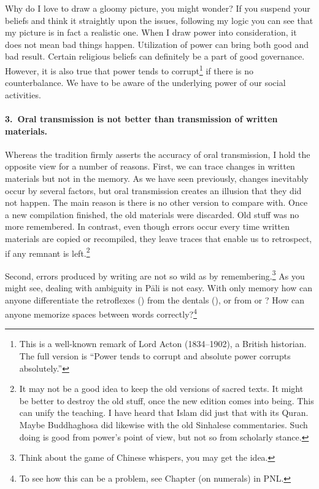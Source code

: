 Why do I love to draw a gloomy picture, you might wonder? If you suspend your beliefs and think it straightly upon the issues, following my logic you can see that my picture is in fact a realistic one. When I draw power into consideration, it does not mean bad things happen. Utilization of power can bring both good and bad result. Certain religious beliefs can definitely be a part of good governance. However, it is also true that power tends to corrupt\footnote{This is a well-known remark of Lord Acton (1834--1902), a British historian. The full version is ``Power tends to corrupt and absolute power corrupts absolutely.''} if there is no counterbalance. We have to be aware of the underlying power of our social activities.

\paragraph*{3.\ Oral transmission is not better than transmission of written materials.} Whereas the tradition firmly asserts the accuracy of oral transmission, I hold the opposite view for a number of reasons. First, we can trace changes in written materials but not in the memory. As we have seen previously, changes inevitably occur by several factors, but oral transmission creates an illusion that they did not happen. The main reason is there is no other version to compare with. Once a new compilation finished, the old materials were discarded. Old stuff was no more remembered. In contrast, even though errors occur every time written materials are copied or recompiled, they leave traces that enable us to retrospect, if any remnant is left.\footnote{It may not be a good idea to keep the old versions of sacred texts. It might be better to destroy the old stuff, once the new edition comes into being. This can unify the teaching. I have heard that Islam did just that with its Quran. Maybe Buddhaghosa did likewise with the old Sinhalese commentaries. Such doing is good from power's point of view, but not so from scholarly stance.} 

Second, errors produced by writing are not so wild as by remembering.\footnote{Think about the game of Chinese whispers, you may get the idea.} As you might see, dealing with ambiguity in P\=ali is not easy. With only memory how can anyone differentiate the retroflexes () from the dentals (), or  from  or ? How can anyone memorize spaces between words correctly?\footnote{To see how this can be a problem, see Chapter  (on numerals) in PNL.} 

